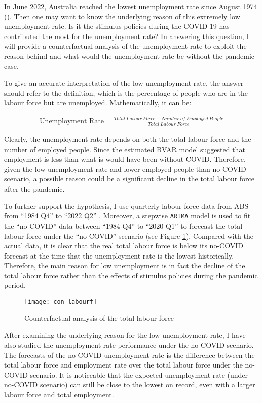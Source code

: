 \documentclass{monashthesis}
\begin{document}
In June 2022, Australia reached the lowest unemployment rate since August 1974 (\textcite{ABS2022a}). Then one may want to know the underlying reason of this extremely low unemployment rate. Is it the stimulus policies during the COVID-19 has contributed the most for the unemployment rate? In answering this question, I will provide a counterfactual analysis of the unemployment rate to exploit the reason behind and what would the unemployment rate be without the pandemic case.

To give an accurate interpretation of the low unemployment rate, the answer should refer to the definition, which is the percentage of people who are in the labour force but are unemployed. Mathematically, it can be:

\[
\begin{aligned}
\text{Unemployment Rate}=\frac{Total\ Labour\  Force- Number\ of \ Employed \ People}{Total\ Labour \ Force}
\label{equ:unemp}
\end{aligned}
\]

Clearly, the unemployment rate depends on both the total labour force and the number of employed people. Since the estimated BVAR model suggested that employment is less than what is would have been without COVID. Therefore, given the low unemployment rate and lower employed people than no-COVID scenario, a possible reason could be a significant decline in the total labour force after the pandemic.

To further support the hypothesis, I use quarterly labour force data from ABS from ``1984 Q4'' to ``2022 Q2'' \autocite{ABS2022}. Moreover, a stepwise \texttt{ARIMA} model \autocite{fpp3} is used to fit the ``no-COVID'' data between ``1984 Q4'' to ``2020 Q1'' to forecast the total labour force under the ``no-COVID'' scenario (see Figure \ref{fig:lab}). Compared with the actual data, it is clear that the real total labour force is below its no-COVID forecast at the time that the unemployment rate is the lowest historically. Therefore, the main reason for low unemployment is in fact the decline of the total labour force rather than the effects of stimulus policies during the pandemic period.

\begin{figure}[H]
\texttt{[image: con\_labourf]}
\centering
\caption{Counterfactual analysis of the total labour force}
\label{fig:lab}
\end{figure}

After examining the underlying reason for the low unemployment rate, I have also studied the unemployment rate performance under the no-COVID scenario. The forecasts of the no-COVID unemployment rate is the difference between the total labour force and employment rate over the total labour force under the no-COVID scenario. It is noticeable that the expected unemployment rate (under no-COVID scenario) can still be close to the lowest on record, even with a larger labour force and total employment.
\end{document}

